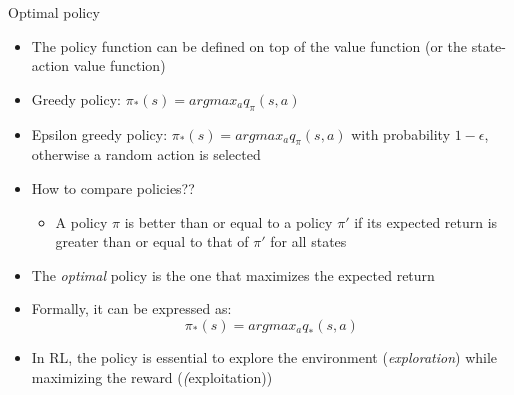 \documentclass[presentation, 9pt]{beamer}\mode<presentation>{\usetheme{AMSBolognaFC}}
\begin{document}
\begin{frame}{Optimal policy}
\begin{itemize}
	\item The policy function can be defined on top of the value function (or the state-action value function)
	\item Greedy policy: $\pi_*(s) = argmax_a q_\pi(s,a)$ 
	\item Epsilon greedy policy: $\pi_*(s) = argmax_a q_\pi(s,a)$ with probability $1-\epsilon$, otherwise a random action is selected
	\item How to compare policies?? 
	\begin{itemize}
		\item A policy $\pi$ is better than or equal to a policy $\pi'$ if its expected return is greater than or equal to that of $\pi'$ for all states
	\end{itemize}
	\item The \emph{optimal} policy is the one that maximizes the expected return
	\item Formally, it can be expressed as:
	\begin{equation*}
		\pi_*(s) = argmax_a q_*(s,a)
	\end{equation*}
	\item In RL, the policy is essential to explore the environment (\emph{exploration}) while maximizing the reward (\emph(exploitation))
\end{itemize}
\end{frame}
\end{document}
